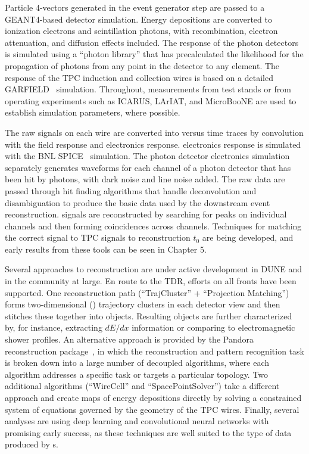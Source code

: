 Particle 4-vectors generated in the event generator step are passed to a {\sc GEANT4}-based detector simulation.  Energy depositions are converted to ionization electrons and scintillation photons, with recombination, electron attenuation, and diffusion effects included.  The response of the photon detectors is simulated using a ``photon library'' that has precalculated the likelihood for the propagation of photons from any point in the detector to any  element.  The response of the TPC induction and collection wires is based on a detailed GARFIELD~\cite{garfield} simulation.  Throughout, measurements from test stands or from operating \lartpc experiments such as ICARUS, LArIAT, and MicroBooNE are used to establish simulation parameters, where possible.

The raw signals on each wire are converted into  versus time traces by convolution with the field response and electronics response.   electronics response is simulated with the BNL SPICE~\cite{spice} simulation.  The photon detector electronics simulation separately generates waveforms for each channel of a photon detector that has been hit by photons, with dark noise and line noise added.  The raw data are passed through hit finding algorithms that handle deconvolution and disambiguation to produce the basic data used by the downstream event reconstruction.  signals are reconstructed by searching for peaks on individual channels and then forming coincidences across channels. Techniques for matching the correct  signal to TPC signals to reconstruction $t_0$ are being developed, and early results from these tools can be seen in \voltitlespfd Chapter 5. 

Several approaches to \lartpc reconstruction are under active development in DUNE and in the community at large.  En route to the TDR, efforts on all fronts have been supported.  One  reconstruction path (``TrajCluster'' + ``Projection Matching'') forms two-dimensional (\twod) trajectory clusters in each detector view and then stitches these together into \threed objects.  Resulting objects are further characterized by, for instance, extracting $dE/dx$ information or comparing to electromagnetic shower profiles.  An alternative approach is provided by the Pandora reconstruction package~\cite{Marshall:2015rfa}, in which the reconstruction and pattern recognition task is broken down into a large number of decoupled algorithms, where each algorithm addresses a specific task or targets a particular topology.  Two additional algorithms (``WireCell'' and ``SpacePointSolver'') take a different approach and create \threed maps of energy depositions directly by solving a constrained system of equations governed by the geometry of the TPC wires.  Finally, several analyses are using deep learning and convolutional neural networks with promising early success, as these techniques are well suited to the type of data produced by \lartpc{}s.

